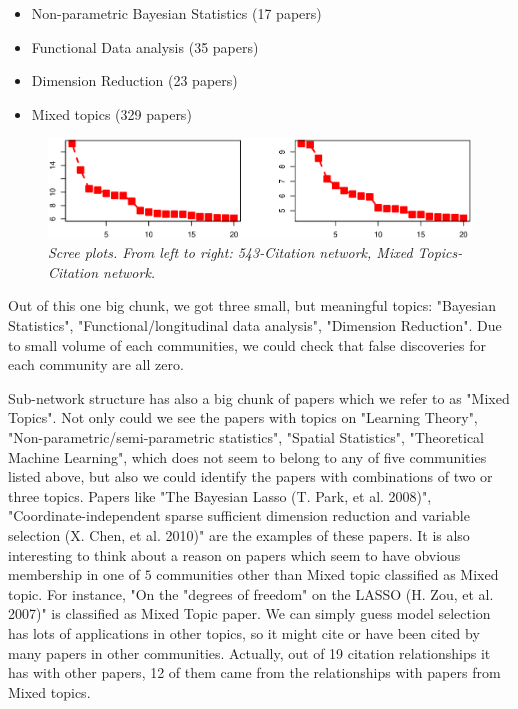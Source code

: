 \documentclass[AMS,STIX1COL]{WileyNJD-v2}
\begin{document}
\begin{itemize}
  \item Non-parametric Bayesian Statistics (17 papers)
  \item Functional Data analysis (35 papers)
  \item Dimension Reduction (23 papers)
  \item Mixed topics (329 papers)
\end{itemize}

\begin{figure}[htbp]
\includegraphics[width=1\textwidth]{Fig4.eps}
\caption{\it Scree plots. From left to right: 543-Citation network, Mixed Topics-Citation network.}
\label{fig:figure4}
\end{figure}

Out of this one big chunk, we got three small, but meaningful topics: "Bayesian Statistics", "Functional/longitudinal data analysis", "Dimension Reduction".
Due to small volume of each communities, we could check that false discoveries for each community are all zero.

Sub-network structure has also a big chunk of papers which we refer to as "Mixed Topics".
Not only could we see the papers with topics on "Learning Theory", "Non-parametric/semi-parametric statistics", "Spatial Statistics", "Theoretical Machine Learning", which does not seem to belong to any of five communities listed above, but also we could identify the papers with combinations of two or three topics.
Papers like "The Bayesian Lasso (T. Park, et al. 2008)", "Coordinate-independent sparse sufficient dimension reduction and variable selection (X. Chen, et al. 2010)" are the examples of these papers.
It is also interesting to think about a reason on papers which seem to have obvious membership in one of $5$ communities other than Mixed topic classified as Mixed topic.
For instance, "On the "degrees of freedom" on the LASSO (H. Zou, et al. 2007)" is classified as Mixed Topic paper.
We can simply guess model selection has lots of applications in other topics, so it might cite or have been cited by many papers in other communities.
Actually, out of 19 citation relationships it has with other papers, 12 of them came from the relationships with papers from Mixed topics.
\end{document}
